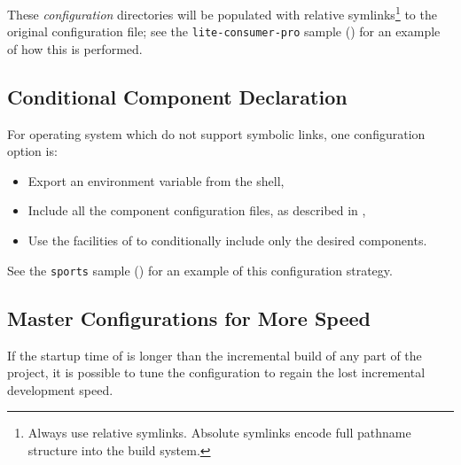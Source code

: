 These \emph{configuration} directories will be populated with relative
symlinks\footnote{Always use relative symlinks.  Absolute symlinks
  encode full pathname structure into the build system.} to the
original configuration file; see the \texttt{lite-consumer-pro} sample
() for an example of how this is
performed.

\subsection{Conditional Component Declaration}

For operating system which do not support symbolic links, one
configuration option is:

\begin{itemize}
\item Export an environment variable from the shell,
\item Include all the component configuration files, as described in
  ,
\item Use the facilities of \gnumake to conditionally include only the
  desired components.
\end{itemize}

See the \texttt{sports} sample () for an example
of this configuration strategy.

\subsection{Master Configurations for More Speed}

If the startup time of \lmsbw is longer than the incremental build of
any part of the project, it is possible to tune the configuration to
regain the lost incremental development speed.


